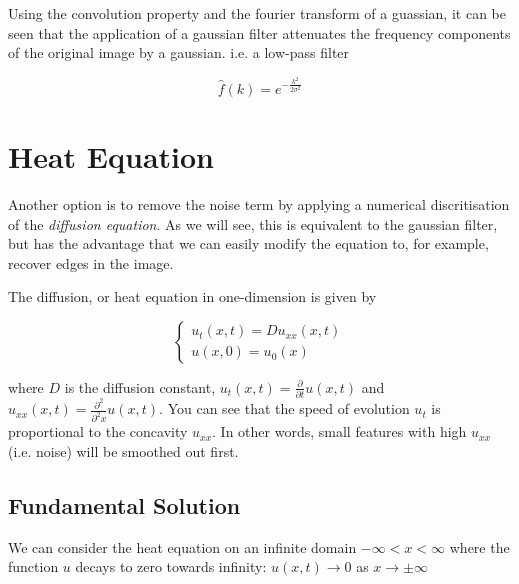 \documentclass[11pt,a4paper,noindent]{article}
\begin{document}
Using the convolution property and the fourier transform of a guassian, it can be seen that the application of a gaussian filter attenuates the frequency components of the original image by a gaussian. i.e. a low-pass filter

\begin{equation}
\hat{f}(k) = e^{-\frac{k^2}{2\sigma^2}}
\end{equation}

\section{Heat Equation}

Another option is to remove the noise term by applying a numerical discritisation of the \emph{diffusion equation}. As we will see, this is equivalent to the gaussian filter, but has the advantage that we can easily modify the equation to, for example, recover edges in the image.

The diffusion, or heat equation in one-dimension is given by

\begin{equation}\label{eq:diffusion}
\left\lbrace \begin{array}{c}
u_t(x,t) = D u_{xx}(x,t) \\
u(x,0) = u_0(x)
\end{array}
\right.
\end{equation}

where $D$ is the diffusion constant, $u_t(x,t)=\frac{\partial}{\partial t} u(x,t)$ and $u_{xx}(x,t) =  \frac{\partial^2}{\partial^2 x} u(x,t)$. You can see that the speed of evolution $u_t$ is proportional to the concavity $u_{xx}$. In other words, small features with high $u_{xx}$ (i.e. noise) will be smoothed out first.

\subsection{Fundamental Solution}

We can consider the heat equation on an infinite domain $-\infty < x < \infty$ where the function $u$ decays to zero towards infinity: $u(x,t) \rightarrow 0$ as $x \rightarrow \pm \infty$
\end{document}
